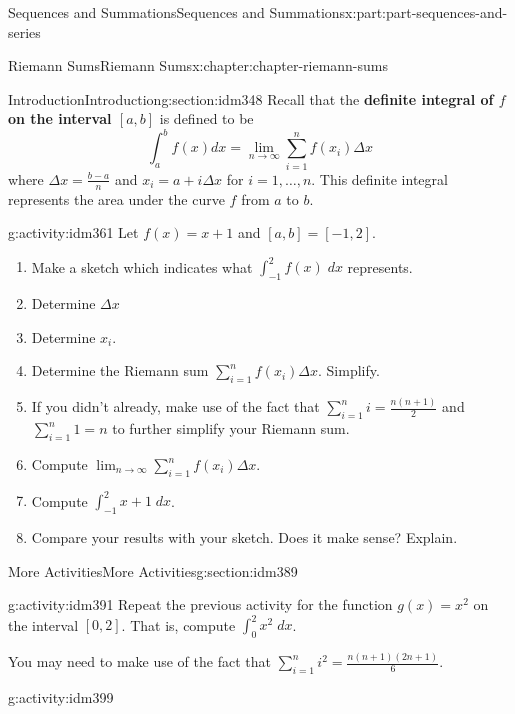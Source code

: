 \documentclass[oneside,10pt,]{book}
\newcommand{\terminology}[1]{\textbf{#1}}
\begin{document}
\begin{partptx}{Sequences and Summations}{}{Sequences and Summations}{}{}{x:part:part-sequences-and-series}
\begin{chapterptx}{Riemann Sums}{}{Riemann Sums}{}{}{x:chapter:chapter-riemann-sums}
\begin{sectionptx}{Introduction}{}{Introduction}{}{}{g:section:idm348}
Recall that the \terminology{definite integral of \(f\) on the interval \([a,b]\)} is defined to be%
\begin{equation*}
\int_a^b f(x) dx = \lim_{n \to \infty} \sum_{i=1}^n f(x_i)\Delta x
\end{equation*}
where \(\displaystyle \Delta x = \frac{b-a}{n}\) and \(x_i = a + i \Delta x\) for \(i = 1, \dots, n\). This definite integral represents the area under the curve \(f\) from \(a\) to \(b\).%
\begin{activity}{}{g:activity:idm361}%
Let \(f(x) = x+1\) and \([a,b] = [-1,2]\).%
\begin{enumerate}[font=\bfseries,label=(\alph*),ref=\alph*]
\item{}Make a sketch which indicates what \(\displaystyle\int_{-1}^2 f(x) \; dx\) represents.\item{}Determine \(\Delta x\)%
\item{}Determine \(x_i\).%
\item{}Determine the Riemann sum \(\displaystyle\sum_{i=1}^n f(x_i) \Delta x\). Simplify.%
\item{}If you didn't already, make use of the fact that \(\displaystyle \sum_{i=1}^n i = \frac{n(n+1)}{2}\) and \(\displaystyle \sum_{i=1}^n 1 = n\) to further simplify your Riemann sum.%
\item{}Compute \(\displaystyle\lim_{n \to \infty} \sum_{i=1}^n f(x_i) \Delta x\).%
\item{}Compute \(\displaystyle\int_{-1}^2 x+1 \; dx\).%
\item{}Compare your results with your sketch. Does it make sense? Explain.%
\end{enumerate}
\end{activity}
\end{sectionptx}
%
%
\typeout{************************************************}
\typeout{************************************************}
%
\begin{sectionptx}{More Activities}{}{More Activities}{}{}{g:section:idm389}
\begin{activity}{}{g:activity:idm391}%
Repeat the previous activity for the function \(g(x) = x^2\) on the interval \([0,2]\). That is, compute \(\displaystyle \int_0^2 x^2 \; dx\).%
\par
You may need to make use of the fact that \(\displaystyle\sum_{i=1}^n i^2 = \frac{n(n+1)(2n+1)}{6}\).%
\end{activity}
\begin{activity}{}{g:activity:idm399}%

\end{activity}
\end{sectionptx}
\end{chapterptx}
\end{partptx}
\end{document}
